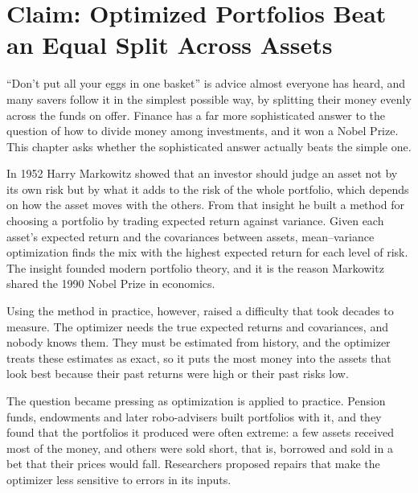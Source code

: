 \makeatletter
\makeatother

\chapter{Claim: Optimized Portfolios Beat an Equal Split Across Assets}
\label{ch:09}

``Don't put all your eggs in one basket'' is advice almost everyone has heard, and many savers follow it in the simplest possible way, by splitting their money evenly across the funds on offer. Finance has a far more sophisticated answer to the question of how to divide money among investments, and it won a Nobel Prize. This chapter asks whether the sophisticated answer actually beats the simple one.

In 1952 Harry Markowitz showed that an investor should judge an asset not by its own risk but by what it adds to the risk of the whole portfolio, which depends on how the asset moves with the others. From that insight he built a method for choosing a portfolio by trading expected return against variance. Given each asset's expected return and the covariances between assets, mean--variance optimization finds the mix with the highest expected return for each level of risk. The insight founded modern portfolio theory, and it is the reason Markowitz shared the 1990 Nobel Prize in economics. 

Using the method in practice, however, raised a difficulty that took decades to measure. The optimizer needs the true expected returns and covariances, and nobody knows them. They must be estimated from history, and the optimizer treats these estimates as exact, so it puts the most money into the assets that look best because their past returns were high or their past risks low.

The question became pressing as optimization is applied to practice. Pension funds, endowments and later robo-advisers built portfolios with it, and they found that the portfolios it produced were often extreme: a few assets received most of the money, and others were sold short, that is, borrowed and sold in a bet that their prices would fall. Researchers proposed repairs that make the optimizer less sensitive to errors in its inputs. 


